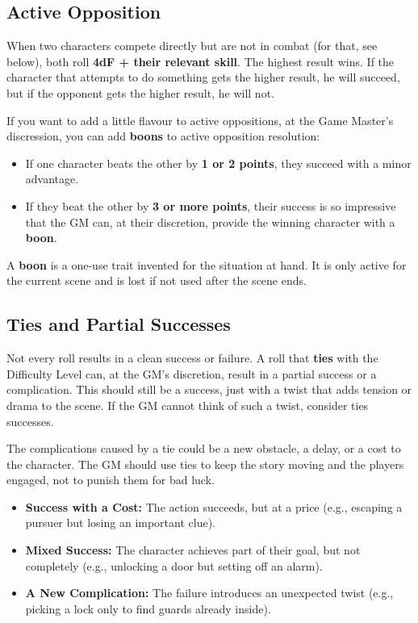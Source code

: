 \begin{multicols}{2}
\subsection{Active Opposition}
When two characters compete directly but are not in combat (for that, see below), both roll \textbf{4dF + their relevant skill}. The highest result wins. If the character that attempts to do something gets the higher result, he will succeed, but if the opponent gets the higher result, he will not.

If you want to add a little flavour to active oppositions, at the Game Master's discression, you can add \textbf{boons} to active opposition resolution:

\begin{Example}
	\begin{itemize}
    	\item If one character beats the other by \textbf{1 or 2 points}, they succeed with a minor advantage.
	    \item If they beat the other by \textbf{3 or more points}, their success is so impressive that the GM can, at their discretion, provide the winning character with a \textbf{boon}.
	\end{itemize}
\end{Example}

A \textbf{boon} is a one-use trait invented for the situation at hand. It is only active for the current scene and is lost if not used after the scene ends.

\subsection{Ties and Partial Successes}
Not every roll results in a clean success or failure. A roll that \textbf{ties} with the Difficulty Level can, at the GM's discretion, result in a partial success or a complication. This should still be a success, just with a twist that adds tension or drama to the scene. If the GM cannot think of such a twist, consider ties successes.

The complications caused by a tie could be a new obstacle, a delay, or a cost to the character. The GM should use ties to keep the story moving and the players engaged, not to punish them for bad luck.
\begin{itemize}
    \item \textbf{Success with a Cost:} The action succeeds, but at a price (e.g., escaping a pursuer but losing an important clue).
    \item \textbf{Mixed Success:} The character achieves part of their goal, but not completely (e.g., unlocking a door but setting off an alarm).
    \item \textbf{A New Complication:} The failure introduces an unexpected twist (e.g., picking a lock only to find guards already inside).
\end{itemize}



\end{multicols}
